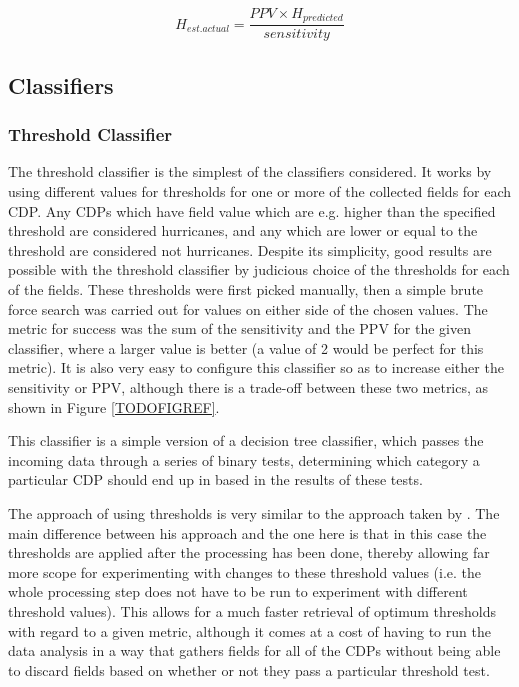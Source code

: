 \documentclass[pdftex,12pt,a4paper]{report}
\begin{document}
\begin{equation}
    H_{est. actual} = \frac{PPV \times H_{predicted}}{sensitivity}
    \label{eqn:n_actual_hurricane}
\end{equation}

\subsection{Classifiers}

\subsubsection{Threshold Classifier}
The threshold classifier is the simplest of the classifiers considered. It works by using different
values for thresholds for one or more of the collected fields for each CDP. Any CDPs which have
field value which are e.g. higher than the specified threshold are considered hurricanes, and any
which are lower or equal to the threshold are considered not hurricanes. Despite its simplicity,
good results are possible with the threshold classifier by judicious choice of the thresholds for
each of the fields. These thresholds were first picked manually, then a simple brute force search
was carried out for values on either side of the chosen values. The metric for success was the sum
of the sensitivity and the PPV for the given classifier, where a larger value is better (a value of
2 would be perfect for this metric). It is also very easy to configure this classifier so as to
increase either the sensitivity or PPV, although there is a trade-off between these two metrics, as
shown in Figure \ref{TODOFIGREF}.

This classifier is a simple version of a decision tree classifier, which passes the incoming data
through a series of binary tests, determining which category a particular CDP should end up in based
in the results of these tests.

The approach of using thresholds is very similar to the approach taken by
\textcite{walshObjective1997}. The main difference between his approach and the one here is that in
this case the thresholds are applied after the processing has been done, thereby allowing far more
scope for experimenting with changes to these threshold values (i.e. the whole processing step does
not have to be run to experiment with different threshold values). This allows for a much faster
retrieval of optimum thresholds with regard to a given metric, although it comes at a cost of having
to run the data analysis in a way that gathers fields for all of the CDPs without being able to
discard fields based on whether or not they pass a particular threshold test.
\end{document}
